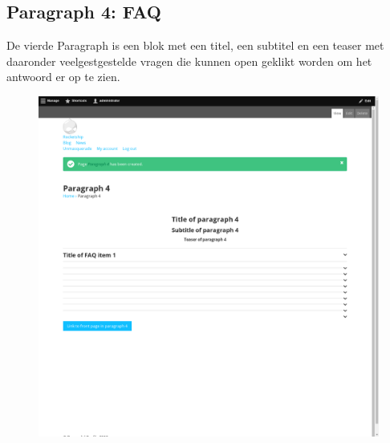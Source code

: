 \subsection{Paragraph 4: FAQ}
De vierde Paragraph is een blok met een titel, een subtitel en een teaser met daaronder veelgestgestelde vragen die kunnen open geklikt worden om het antwoord er op te zien.
\begin{figure}[h]
\includegraphics[width=1\textwidth]{img/p004.png}
\end{figure}

\clearpage
